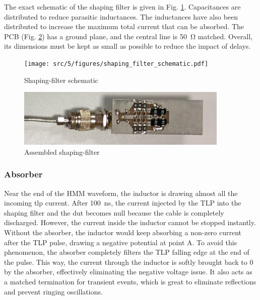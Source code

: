 The exact schematic of the shaping filter is given in Fig. \ref{fig:shaping_filter_schematic}.
Capacitances are distributed to reduce parasitic inductances.
The inductances have also been distributed to increase the maximum total current that can be absorbed.
The PCB (Fig. \ref{pic:shaping_filter_assembled}) has a ground plane, and the central line is \SI{50}{\ohm} matched.
Overall, its dimensions must be kept as small as possible to reduce the impact of delays.

\begin{figure}[!h]
  \centering
  \texttt{[image: src/5/figures/shaping\_filter\_schematic.pdf]}
  \caption{Shaping-filter schematic}
  \label{fig:shaping_filter_schematic}
\end{figure}

\begin{figure}[!h]
  \centering
  \includegraphics[width=0.9\textwidth]{src/5/figures/filter.jpg}
  \caption{Assembled shaping-filter}
  \label{pic:shaping_filter_assembled}
\end{figure}

\subsubsection{Absorber}

Near the end of the HMM waveform, the inductor is drawing almost all the incoming \gls{tlp} current.
After \SI{100}{\nano\second}, the current injected by the TLP into the shaping filter and the \gls{dut} becomes null because the cable is completely discharged.
However, the current inside the inductor cannot be stopped instantly.
Without the absorber, the inductor would keep absorbing a non-zero current after the TLP pulse, drawing a negative potential at point A.
To avoid this phenomenon, the absorber completely filters the TLP falling edge at the end of the pulse.
This way, the current through the inductor is softly brought back to 0 by the absorber, effectively eliminating the negative voltage issue.
It also acts as a matched termination for transient events, which is great to eliminate reflections and prevent ringing oscillations.

